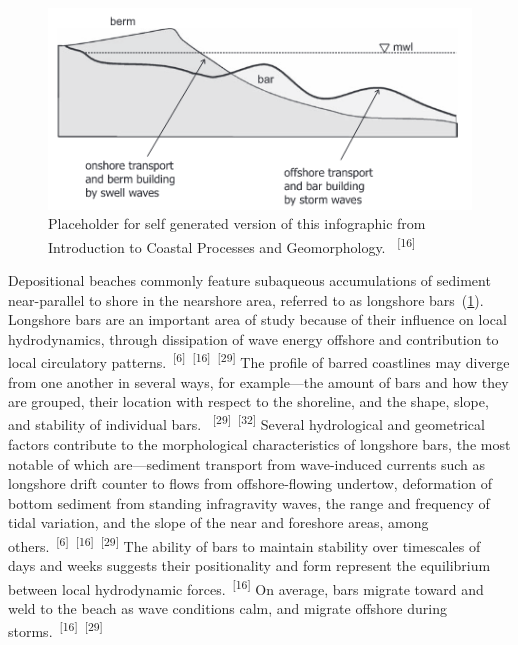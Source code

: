 \documentclass{article}
\begin{document}
\begin{figure}
    \centering
    \includegraphics[width=.9\linewidth]{images/barred-profile.png}
    \caption{Placeholder for self generated version of this infographic from Introduction to Coastal Processes and Geomorphology. ~\textsuperscript{[16]}}
    \label{figure9}
\end{figure}

\par{Depositional beaches commonly feature subaqueous accumulations of sediment near-parallel to shore in the nearshore area, referred to as longshore bars~(\cref{figure9}). Longshore bars are an important area of study because of their influence on local hydrodynamics, through dissipation of wave energy offshore and contribution to local circulatory patterns.~\textsuperscript{[6]}~\textsuperscript{[16]}~\textsuperscript{[29]} The profile of barred coastlines may diverge from one another in several ways, for example---the amount of bars and how they are grouped, their location with respect to the shoreline, and the shape, slope, and stability of individual bars. ~\textsuperscript{[29]}~\textsuperscript{[32]} Several hydrological and geometrical factors contribute to the morphological characteristics of longshore bars, the most notable of which are---sediment transport from wave-induced currents such as longshore drift counter to flows from offshore-flowing undertow, deformation of bottom sediment from standing infragravity waves, the range and frequency of tidal variation, and the slope of the near and foreshore areas, among others.~\textsuperscript{[6]}~\textsuperscript{[16]}~\textsuperscript{[29]} The ability of bars to maintain stability over timescales of days and weeks suggests their positionality and form represent the equilibrium between local hydrodynamic forces.~\textsuperscript{[16]} On average, bars migrate toward and weld to the beach as wave conditions calm, and migrate offshore during storms.~\textsuperscript{[16]}~\textsuperscript{[29]}}
\end{document}
